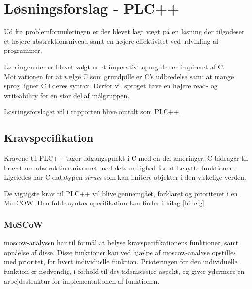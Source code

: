 \section{Løsningsforslag - PLC++}
Ud fra problemformuleringen er der blevet lagt vægt på en løsning der tilgodeser et højere abstraktionsniveau samt en højere effektivitet ved udvikling af programmer.

Løsningen der er blevet valgt er et imperativt sprog der er inspireret af C. Motivationen for at vælge C som grundpille er C's udbredelse samt at mange sprog ligner C i deres syntax. Derfor vil sproget have en højere read- og writeability for en stor del af målgruppen.

Løsningsforslaget vil i rapporten blive omtalt som PLC++.

\subsection{Kravspecifikation}
Kravene til PLC++ tager udgangspunkt i C med en del ændringer. C bidrager til kravet om abstraktionsniveauet med dets mulighed for at benytte funktioner. Ligeledes har C datatypen \textit{struct} som kan imitere objekter i den virkelige verden.

De vigtigste krav til PLC++ vil blive gennemgået, forklaret og prioriteret i en MosCOW. Den fulde syntax specifikation kan findes i bilag \ref{bil:cfg}

\subsubsection{MoSCoW}
\gls{moscow}-analysen har til formål at belyse kravspecifikationens funktioner, samt opnåelse af disse.
Disse funktioner kan ved hjælpe af \gls{moscow}-analyse opstilles med prioritet, for hvert individuelle funktion.
Prioteringen for den individuelle funktion er nødvendig, i forhold til det tidsmæssige aspekt, og giver ydermere en arbejdsstruktur for implementationen af funktionen.

